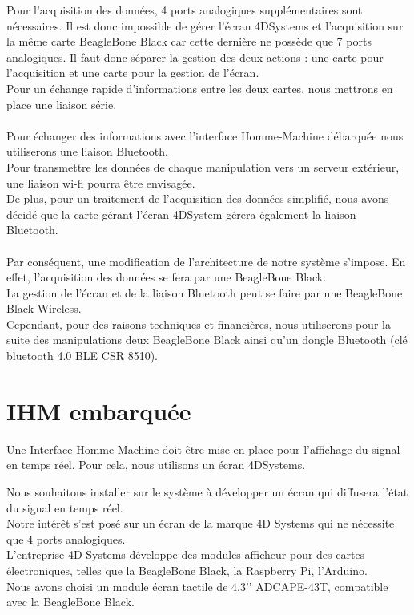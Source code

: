 \documentclass{report}
\begin{document}
Pour l’acquisition des donn\'{e}es, 4 ports analogiques suppl\'{e}mentaires sont n\'{e}cessaires. Il est
donc impossible de g\'{e}rer l’\'{e}cran 4DSystems et l’acquisition sur la m\^{e}me carte BeagleBone
Black car cette derni\`{e}re ne poss\`{e}de que 7 ports analogiques. Il faut donc s\'{e}parer la gestion
des deux actions : une carte pour l’acquisition et une carte pour la gestion de l’\'{e}cran.\\
Pour un \'{e}change rapide d’informations entre les deux cartes, nous mettrons en place une
liaison s\'{e}rie.\\ \\

Pour \'{e}changer des informations avec l’interface Homme-Machine d\'{e}barqu\'{e}e nous
utiliserons une liaison Bluetooth.\\
Pour transmettre les donn\'{e}es de chaque manipulation vers un serveur ext\'{e}rieur, une liaison
wi-fi pourra \^{e}tre envisag\'{e}e.\\
De plus, pour un traitement de l’acquisition des donn\'{e}es simplifi\'{e}, nous avons d\'{e}cid\'{e} que la
carte g\'{e}rant l’\'{e}cran 4DSystem g\'{e}rera \'{e}galement la liaison Bluetooth.\\ \\

Par cons\'{e}quent, une modification de l’architecture de notre syst\`{e}me s’impose.
En effet, l’acquisition des donn\'{e}es se fera par une BeagleBone Black.\\
La gestion de l’\'{e}cran et de la liaison Bluetooth peut se faire par une BeagleBone Black
Wireless.\\
Cependant, pour des raisons techniques et financi\`{e}res, nous utiliserons pour la suite des
manipulations deux BeagleBone Black ainsi qu’un dongle Bluetooth (cl\'{e} bluetooth 4.0 BLE
CSR 8510).\\


\section{IHM embarqu\'{e}e}

Une Interface Homme-Machine doit \^{e}tre mise en place pour l’affichage du signal en temps
r\'{e}el. Pour cela, nous utilisons un \'{e}cran 4DSystems.



Nous souhaitons installer sur le syst\`{e}me \`{a} d\'{e}velopper un \'{e}cran qui diffusera l’\'{e}tat du signal
en temps r\'{e}el.\\
Notre int\'{e}r\^{e}t s’est pos\'{e} sur un \'{e}cran de la marque 4D Systems qui ne n\'{e}cessite que 4 ports
analogiques.\\
L’entreprise 4D Systems d\'{e}veloppe des modules afficheur pour des cartes \'{e}lectroniques,
telles que la BeagleBone Black, la Raspberry Pi, l’Arduino.\\
Nous avons choisi un module \'{e}cran tactile de 4.3’’ ADCAPE-43T, compatible avec la
BeagleBone Black.\\ \\
\end{document}
